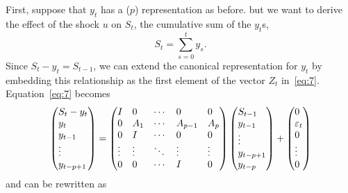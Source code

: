 \documentclass[12pt,fleqn]{article}
\begin{document}
First, suppose that $y_t$ has a \VAR($p$) representation as before.
but we want to derive the effect of the shock $u$ on $S_t$, the
cumulative sum of the $y_t$s,
\[
  S_t = \sum_{s=0}^t y_s.
\]
Since $S_t - y_t = S_{t-1}$, we can extend the canonical
representation for $y_t$ by embedding this relationship as the first
element of the vector $Z_t$ in~\eqref{eq:7}. Equation~\eqref{eq:7}
becomes
\begin{equation*}
  \begin{pmatrix*}[l]
    S_t - y_t \\ y_t \\ y_{t-1} \\ \vdots \\ y_{t-p+1}
  \end{pmatrix*}
  =
  \begin{pmatrix*}[l]
    I      & 0      & \cdots & 0       & 0      \\
    0      & A_1    & \cdots & A_{p-1} & A_p    \\
    0      & I      & \cdots & 0       & 0      \\
    \vdots & \vdots & \ddots & \vdots  & \vdots \\
    0      & 0      & \cdots & I       & 0
  \end{pmatrix*}
  \begin{pmatrix*}[l]
    S_{t-1}  \\ y_{t-1} \\ \vdots \\ y_{t-p+1} \\ y_{t-p}
  \end{pmatrix*}
  +
  \begin{pmatrix*}[l]
    0 \\ \vep_t \\ 0 \\ \vdots \\ 0
  \end{pmatrix*}
\end{equation*}
and can be rewritten as
\end{document}
